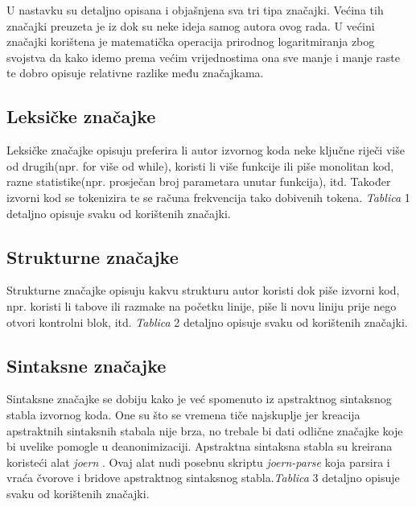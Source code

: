 	U nastavku su detaljno opisana i objašnjena sva tri tipa značajki. Većina tih značajki preuzeta je iz \cite{islam} dok su neke ideja samog autora ovog rada. U većini značajki korištena je matematička operacija prirodnog logaritmiranja zbog svojstva da kako idemo prema većim vrijednostima ona sve manje i manje raste te dobro opisuje relativne razlike među značajkama.

\subsection{Leksičke značajke}
Leksičke značajke opisuju preferira li autor izvornog koda neke ključne riječi više od drugih(npr. for više od while), koristi li više funkcije ili piše monolitan kod, razne statistike(npr. prosječan broj parametara unutar funkcija), itd. Također izvorni kod se tokenizira te se računa frekvencija tako dobivenih tokena. \textit{Tablica} 1 detaljno opisuje svaku od korištenih značajki. 


\subsection{Strukturne značajke}
Strukturne značajke opisuju kakvu strukturu autor koristi dok piše izvorni kod, npr. koristi li tabove ili razmake na početku linije, piše li novu liniju prije nego otvori kontrolni blok, itd. \textit{Tablica} 2 detaljno opisuje svaku od korištenih značajki.


\subsection{Sintaksne značajke}
Sintaksne značajke se dobiju kako je već spomenuto iz apstraktnog sintaksnog stabla izvornog koda. One su što se vremena tiče najskuplje jer kreacija apstraktnih sintaksnih stabala nije brza, no trebale bi dati odlične značajke koje bi uvelike pomogle u deanonimizaciji. Apstraktna sintaksna stabla su kreirana koristeći alat \textit{joern} \cite{joern}. Ovaj alat nudi posebnu skriptu \textit{joern-parse} koja parsira i vraća čvorove i bridove apstraktnog sintaksnog stabla.\textit{Tablica} 3 detaljno opisuje svaku od korištenih značajki.


